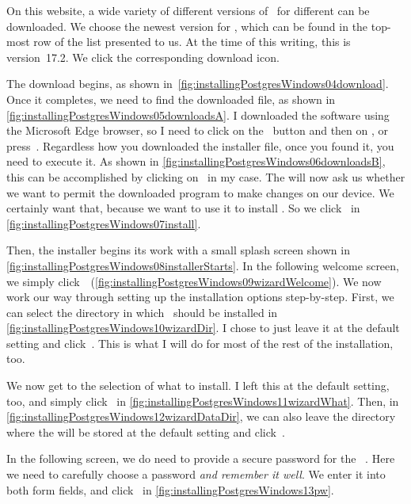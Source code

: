 On this website, a wide variety of different versions of \postgresql\ for different  can be downloaded.
We choose the newest version for \windows, which can be found in the top-most row of the list presented to us.
At the time of this writing, this is version~17.2.
We click the corresponding download icon.

The download begins, as shown in~\cref{fig:installingPostgresWindows04download}.
Once it completes, we need to find the downloaded file, as shown in \cref{fig:installingPostgresWindows05downloadsA}.
I downloaded the software using the Microsoft Edge browser, so I need to click on the \keys{\dots}~button and then on , or press~.
Regardless how you downloaded the installer file, once you found it, you need to execute it.
As shown in \cref{fig:installingPostgresWindows06downloadsB}, this can be accomplished by clicking on~ in my case.
The  will now ask us whether we want to permit the downloaded program to make changes on our device.
We certainly want that, because we want to use it to install \postgresql.
So we click~ in \cref{fig:installingPostgresWindows07install}.

Then, the installer begins its work with a small splash screen shown in \cref{fig:installingPostgresWindows08installerStarts}.
In the following welcome screen, we simply click~~(\cref{fig:installingPostgresWindows09wizardWelcome}).
We now work our way through setting up the installation options step-by-step.
First, we can select the directory in which \postgresql\ should be installed in \cref{fig:installingPostgresWindows10wizardDir}.
I chose to just leave it at the default setting and click~.
This is what I will do for most of the rest of the installation, too.

We now get to the selection of what to install.
I left this at the default setting, too, and simply click~ in \cref{fig:installingPostgresWindows11wizardWhat}.
Then, in \cref{fig:installingPostgresWindows12wizardDataDir}, we can also leave the directory where the  will be stored at the default setting and click~.

In the following screen, we do need to provide a secure password for the \postgresql\ .
Here we need to carefully choose a password \emph{and remember it well}.
We enter it into both form fields, and click~ in \cref{fig:installingPostgresWindows13pw}.


